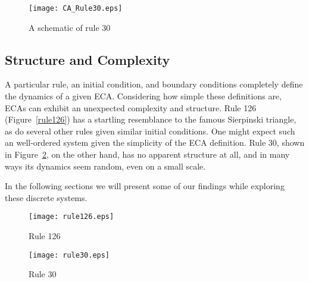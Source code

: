 \begin{figure}
    \centering
    \texttt{[image: CA\_Rule30.eps]}
    \caption{\label{carule30} A schematic of rule 30}
\end{figure}


\subsection{Structure and Complexity}
A particular rule, an initial condition, and boundary conditions
completely define the dynamics of a given ECA.
Considering how simple these definitions are, ECAs can exhibit an
unexpected complexity and structure.
Rule 126 (Figure~\ref{rule126}) has a startling resemblance to the
famous Sierpinski triangle, as do several other rules given similar
initial conditions.
One might expect such an well-ordered system given the simplicity of
the ECA definition.
Rule 30, shown in Figure~\ref{rule30}, on the other hand,  has no
apparent structure at all, and in many ways its dynamics seem random,
even on a small scale.

In the following sections we will present some of our findings while
exploring these discrete systems.

\begin{figure}
    \begin{minipage}[b]{0.49\textwidth}
        \centering
        \texttt{[image: rule126.eps]}
        \caption{\label{rule126} Rule 126}
    \end{minipage}
    \hspace{0.5cm}
    \begin{minipage}[b]{0.49\textwidth}
        \centering
        \texttt{[image: rule30.eps]}
        \caption{\label{rule30} Rule 30}
    \end{minipage}
\end{figure}
